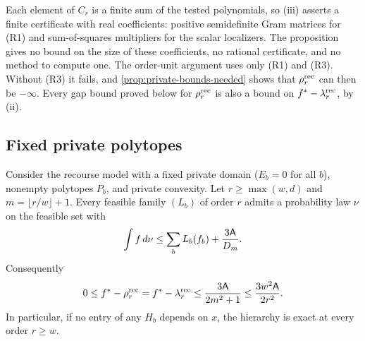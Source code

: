 Each element of $C_r$ is a finite sum of the tested polynomials, so (iii)
asserts a finite certificate with real coefficients: positive semidefinite
Gram matrices for (R1) and sum-of-squares multipliers for the scalar localizers.
The proposition gives no bound on the size of these coefficients, no
rational certificate, and no method to compute one. The order-unit
argument uses only (R1) and (R3). Without (R3) it fails, and
\cref{prop:private-bounds-needed} shows that $\rho^{\mathrm{rec}}_r$ can then be
$-\infty$. Every gap bound proved below for $\rho^{\mathrm{rec}}_r$ is also a bound on
$f^{*}-\lambda^{\mathrm{rec}}_r$, by (ii).

\subsection{Fixed private polytopes}\label{sec:rec-fixed}

\begin{theorem}\label{thm:fixed-recourse}
Consider the recourse model with a fixed private domain ($E_b=0$ for all
$b$), nonempty polytopes $P_b$, and private convexity. Let $r\ge\max(w,d)$
and $m=\lfloor r/w\rfloor+1$. Every feasible family $(L_b)$ of order $r$
admits a probability law $\nu$ on the feasible set with
\begin{equation}\label{eq:rec-fixed-rounding}
  \int f\,d\nu\le\sum_bL_b(f_b)+\frac{3\mathsf{A}}{D_m}.
\end{equation}
Consequently
\[
  0\le f^{*}-\rho^{\mathrm{rec}}_r=f^{*}-\lambda^{\mathrm{rec}}_r
  \le\frac{3\mathsf{A}}{2m^2+1}\le\frac{3w^2\mathsf{A}}{2r^2}.
\]
In particular, if no entry of any $H_b$ depends on $x$, the hierarchy is
exact at every order $r\ge w$.
\end{theorem}

